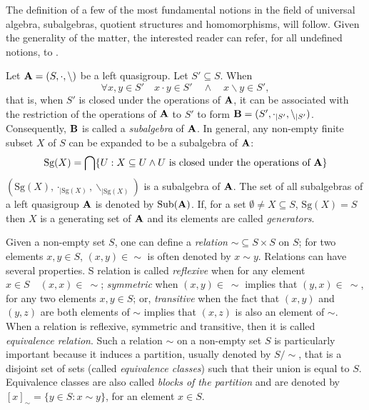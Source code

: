 \documentclass{mcom-l}
\begin{document}
\noindent The definition of a few of the most fundamental notions in the field of universal algebra, subalgebras, quotient structures and homomorphisms, will follow. Given the generality of the matter, the interested reader can refer, for all undefined notions, to \cite{burris1981course}.
\begin{definition} \cite{burris1981course}\newline
Let $\mathbf{A} = (S, \cdot, \backslash)$ be a left quasigroup. Let $S'\subseteq S$. When \[\forall x,y \in S'\quad x\cdot y \in S'\quad\land\quad x\backslash y \in S',\]
that is, when $S'$ is closed under the operations of $\mathbf{A}$, it can be associated with the restriction of the operations of $\mathbf{A}$ to $S'$ to form $\mathbf{B} = (S', \cdot_{|S'}, \backslash_{|S'})$. Consequently, $\mathbf{B}$ is called a \emph{subalgebra} of $\mathbf{A}$. \newline In general, any non-empty finite subset $X$ of $S$ can be expanded to be a subalgebra of $\mathbf{A}$:
 \[ \text{Sg}(X) = \bigcap\{U : X \subseteq U \land U~\text{is closed under the operations of}~\mathbf{A} \} \]
 $(\text{Sg}(X), \cdot_{|\text{Sg}(X)}, \backslash_{|\text{Sg}(X)})$ is a subalgebra of $\mathbf{A}$.\newline
 The set of all subalgebras of a left quasigroup $\mathbf{A}$ is denoted by $\operatorname{Sub}(\mathbf{A})$.\newline
 If, for a set $\emptyset \neq X \subseteq S$, $\text{Sg}(X)=S$ then $X$ is a generating set of $\mathbf{A}$ and its elements are called \emph{generators}.
\end{definition}
\noindent Given a non-empty set $S$, one can define a \emph{relation} $\sim\subseteq S\times S$ on $S$; for two elements $x,y\in S$, $(x,y)\in \sim$ is often denoted by $x\sim y$. Relations can have several properties. S relation is called \emph{reflexive} when for any element $x\in S\quad (x,x)\in~\sim$; \emph{symmetric} when $(x,y)\in~\sim$ implies that $(y,x)\in~\sim$, for any two elements $x,y\in S$; or, \emph{transitive} when 
the fact that $(x,y)$ and $(y,z)$ are both elements of $\sim$ implies that 
$(x,z)$ is also an element of $\sim$. When a relation is  reflexive, symmetric and transitive, then it is called \emph{equivalence relation}. Such a relation $\sim$ on a non-empty set $S$ is particularly important because it induces a partition, usually denoted by $S/\sim$, that is a disjoint set of sets (called \emph{equivalence classes}) such that their union is equal to $S$.  Equivalence classes are also called \emph{blocks of the partition} and are denoted by $[x]_\sim = \{ y \in S : x \sim y\}$, for an element $x\in S$.
\end{document}
